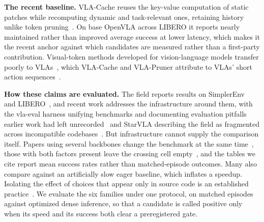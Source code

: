 \textbf{The recent baseline.} VLA-Cache reuses the key-value computation of
static patches while recomputing dynamic and task-relevant ones, retaining
history unlike token pruning~\cite{vlacache}. On base OpenVLA across LIBERO it
reports nearly maintained rather than improved average success at lower latency,
which makes it the recent anchor against which candidates are measured rather
than a first-party contribution. Visual-token methods developed for
vision-language models transfer poorly to VLAs~\cite{fastv, sparsevlm, tome},
which VLA-Cache and VLA-Pruner attribute to VLAs' short action
sequences~\cite{vlacache, vlapruner}.

\textbf{How these claims are evaluated.} The field reports results on
SimplerEnv~\cite{simplerenv} and LIBERO~\cite{libero}, and recent work addresses
the infrastructure around them, with the vla-eval harness unifying benchmarks
and documenting evaluation pitfalls earlier work had left
unrecorded~\cite{vlaeval} and StarVLA describing the field as fragmented across
incompatible codebases~\cite{starvla}. But infrastructure cannot supply the
comparison itself. Papers using several backbones change the benchmark at the
same time~\cite{vlacache, specprune, vlaiap}, those with both factors present
leave the crossing cell empty~\cite{gazereg, vlapruner}, and the tables we cite
report mean success rates rather than matched-episode outcomes. Many also
compare against an artificially slow eager baseline, which inflates a speedup.
Isolating the effect of choices that appear only in source code is an
established practice~\cite{bagoftricks_cnn, bagoftricks_llm}. We evaluate the six
families under one protocol, on matched episodes against optimized dense
inference, so that a candidate is called positive only when its speed and its
success both clear a preregistered gate.
